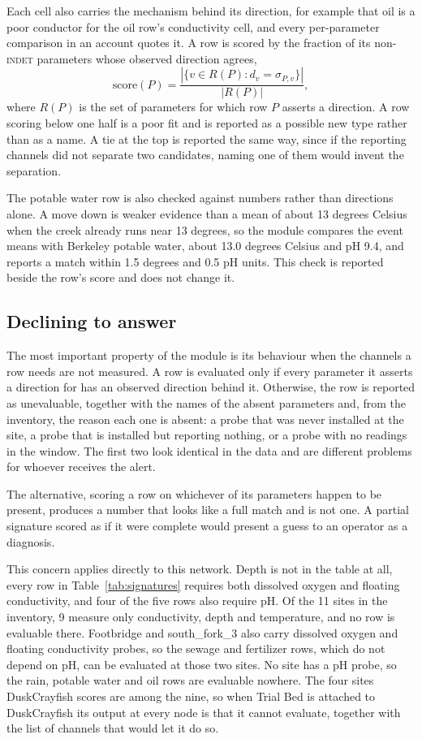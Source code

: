 \documentclass{article}
\begin{document}
Each cell also carries the mechanism behind its direction, for example that
oil is a poor conductor for the oil row's conductivity cell, and every
per-parameter comparison in an account quotes it. A row is scored by the
fraction of its non-\textsc{indet} parameters whose observed direction agrees,
\begin{equation}
  \mathrm{score}(P) = \frac{|\{v \in R(P) : d_{v} = \sigma_{P,v}\}|}{|R(P)|},
\end{equation}
where $R(P)$ is the set of parameters for which row $P$ asserts a direction. A
row scoring below one half is a poor fit and is reported as a possible new type
rather than as a name. A tie at the top is reported the same way, since if the
reporting channels did not separate two candidates, naming one of them would
invent the separation.

The potable water row is also checked against numbers rather than directions
alone. A move down is weaker evidence than a mean of about 13 degrees Celsius
when the creek already runs near 13 degrees, so the module compares the event
means with Berkeley potable water, about 13.0 degrees Celsius and pH 9.4, and
reports a match within 1.5 degrees and 0.5 pH units. This check is reported
beside the row's score and does not change it.

\subsection{Declining to answer}

The most important property of the module is its behaviour when the channels a
row needs are not measured. A row is evaluated only if every parameter it
asserts a direction for has an observed direction behind it. Otherwise, the row
is reported as unevaluable, together with the names of the absent parameters
and, from the inventory, the reason each one is absent: a probe that was never
installed at the site, a probe that is installed but reporting nothing, or a
probe with no readings in the window. The first two look identical in the data
and are different problems for whoever receives the alert.

The alternative, scoring a row on whichever of its parameters happen to be
present, produces a number that looks like a full match and is not one. A
partial signature scored as if it were complete would present a guess to an
operator as a diagnosis.

This concern applies directly to this network. Depth is not in the table at
all, every row in Table~\ref{tab:signatures} requires both dissolved oxygen
and floating conductivity, and four of the five rows also require pH. Of the
11 sites in the inventory, 9 measure only conductivity, depth and temperature,
and no row is evaluable there. Footbridge and south\_fork\_3 also carry
dissolved oxygen and floating conductivity probes, so the sewage and
fertilizer rows, which do not depend on pH, can be evaluated at those two
sites. No site has a pH probe, so the rain, potable water and oil rows are
evaluable nowhere. The four sites DuskCrayfish scores are among the nine, so
when Trial Bed is attached to DuskCrayfish its output at every node is that it
cannot evaluate, together with the list of channels that would let it do so.
\end{document}
